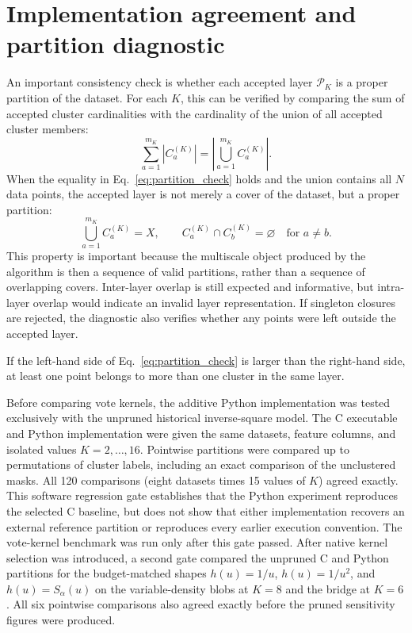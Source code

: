 \documentclass[pdflatex,sn-mathphys-num]{sn-jnl}
\newcommand{\calP}{\mathcal{P}}
\begin{document}
\section{Implementation agreement and partition diagnostic}\label{sec:partition_diagnostic}

An important consistency check is whether each accepted layer $\calP_K$ is a proper partition of the dataset. For each $K$, this can be verified by comparing the sum of accepted cluster cardinalities with the cardinality of the union of all accepted cluster members:
\begin{equation}
\sum_{a=1}^{m_K}|C_a^{(K)}|=\left|\bigcup_{a=1}^{m_K}C_a^{(K)}\right|.
\label{eq:partition_check}
\end{equation}
When the equality in Eq.~\eqref{eq:partition_check} holds and the union contains all $N$ data points, the accepted layer is not merely a cover of the dataset, but a proper partition:
\begin{equation}
\bigcup_{a=1}^{m_K} C_a^{(K)}=X,
\qquad
C_a^{(K)}\cap C_b^{(K)}=\varnothing
\quad\text{for }a\neq b.
\end{equation}
This property is important because the multiscale object produced by the algorithm is then a sequence of valid partitions, rather than a sequence of overlapping covers. Inter-layer overlap is still expected and informative, but intra-layer overlap would indicate an invalid layer representation. If singleton closures are rejected, the diagnostic also verifies whether any points were left outside the accepted layer.

If the left-hand side of Eq.~\eqref{eq:partition_check} is larger than the right-hand side, at least one point belongs to more than one cluster in the same layer.

Before comparing vote kernels, the additive Python implementation was tested exclusively with the unpruned historical inverse-square model. The C executable and Python implementation were given the same datasets, feature columns, and isolated values $K=2,\ldots,16$. Pointwise partitions were compared up to permutations of cluster labels, including an exact comparison of the unclustered masks. All 120 comparisons (eight datasets times 15 values of $K$) agreed exactly. This software regression gate establishes that the Python experiment reproduces the selected C baseline, but does not show that either implementation recovers an external reference partition or reproduces every earlier execution convention. The vote-kernel benchmark was run only after this gate passed.  After native kernel selection was introduced, a second gate compared the unpruned C and Python partitions for the budget-matched shapes $h(u)=1/u$, $h(u)=1/u^2$, and $h(u)=S_\alpha(u)$ on the variable-density blobs at $K=8$ and the bridge at $K=6$.  All six pointwise comparisons also agreed exactly before the pruned sensitivity figures were produced.
\end{document}
